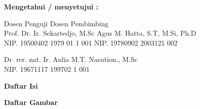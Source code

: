 \documentclass[12pt]{article}
\begin{document}
	\vspace{20pt}
	
	\begin{center}
		\textbf{Mengetahui / menyetujui :}
	\end{center}

	
	\begin{center}
		Dosen Penguji \hspace{150pt} Dosen Pembimbing \\
		Prof. Dr. Ir. Sekartedjo, M.Sc \hspace{75pt} Agus M. Hatta, S.T, M.Si, Ph.D \\
		NIP. 19500402 1979 01 1 001 \hspace{85pt} NIP. 19780902 2003121 002 \\
	\end{center}

	\vspace{75pt}	
	
	\begin{flushleft}
		Dr. rer. nat. Ir. Aulia M.T. Nasution., M.Sc \\
		NIP. 19671117 199702 1 001
	\end{flushleft}


\newpage
\thispagestyle{plain}
\mbox{}


\newpage

	\begin{center}
		\textbf{{\large Daftar Isi}}
	\end{center}
	
	\tableofcontents


\newpage
\thispagestyle{plain}
\mbox{}


\newpage

	\begin{center}
		\textbf{{\large Daftar Gambar}}
	\end{center}

	\listoffigures

\end{document}
